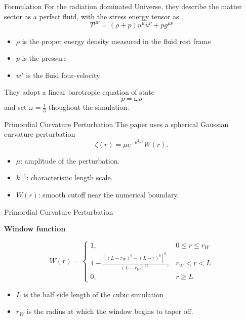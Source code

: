 \documentclass[aspectratio=169, 12pt]{beamer}
\begin{document}
\begin{frame}{Formulation}
	For the radiation dominated Universe, they describe the matter sector 
	as a perfect fluid, with the stress energy tensor as
	\begin{equation}
		\label{eq:Tmu}
		T^{\mu\nu} = (\rho + p) u^\mu u^\nu + p g^{\mu\nu}
	\end{equation}

	\begin{itemize}
	    \item $\rho$ is the proper energy density measured in the fluid rest frame
		\item $p$ is the pressure
		\item $u^\mu$ is the fluid four-velocity
	\end{itemize}

	They adopt a linear barotropic equation of state
	\[
		p = \omega \rho
	\]
	and set $\displaystyle \omega = \frac{1}{3}$ thoughout the simulation.
\end{frame}

\begin{frame}{Primordial Curvature Perturbation}
    The paper uses a spherical Gaussian curvature perturbation
	\begin{equation}
		\label{eq:gauss-curve}
        \zeta(r)
        =
        \mu e^{-k^2r^2}W(r).
	\end{equation}
    \begin{itemize}
        \item $\mu$: amplitude of the perturbation.
        \item $k^{-1}$: characteristic length scale.
        \item $W(r)$: smooth cutoff near the numerical boundary.
    \end{itemize}
\end{frame}
\begin{frame}{Primordial Curvature Perturbation}
	\begin{center}
	{\large\bfseries Window function}
	\end{center}
	\[
		W(r) = \begin{cases}
			1, & 0\leq r \leq r_W\\
			1 - \frac{[(L-r_W)^6 - (L-r)^6]^6}{(L-r_W)^36} ,
			   & r_W < r < L\\
			0, & r\geq L
		\end{cases}
	\]
	\begin{itemize}
	    \item $L$ is the half side length of the cubic simulation
		\item $r_W$ is the radius at which the window begins to taper off.
	\end{itemize}
	
\end{frame}
\end{document}
